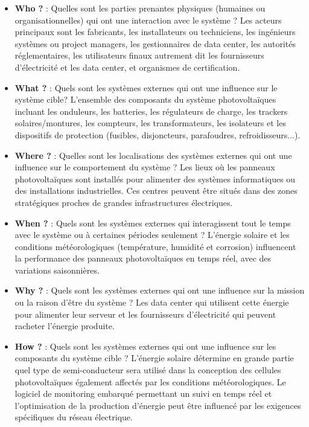 \documentclass{article}
\begin{document}
\begin{itemize}
    \item \textbf{Who ?} : Quelles sont les parties prenantes physiques (humaines ou organisationnelles) qui ont une interaction avec le système ?
    Les acteurs principaux sont les fabricants, les installateurs ou techniciens, les ingénieurs systèmes ou project managers, les gestionnaires de data center, les autorités réglementaires, les utilisateurs finaux autrement dit les fournisseurs d'électricité et les data center, et organismes de certification.
    \item \textbf{What ?} : Quels sont les systèmes externes qui ont une influence sur le système cible? L'ensemble des composants du système photovoltaïques incluant les onduleurs, les batteries, les régulateurs de charge, les trackers solaires/montures, les compteurs, les transformateurs, les isolateurs et les dispositifs de protection (fusibles, disjoncteurs, parafoudres, refroidisseurs...).
    \item \textbf{Where ?} : Quelles sont les localisations des systèmes externes qui ont une influence sur le comportement du système ?
    Les lieux où les panneaux photovoltaïques sont installés pour alimenter des systèmes informatiques ou des installations industrielles. Ces centres peuvent être situés dans des zones stratégiques proches de grandes infrastructures électriques.
    \item \textbf{When ?} : Quels sont les systèmes externes qui interagissent tout le temps avec le système ou à certaines périodes seulement ?  L'énergie solaire et les conditions météorologiques (température, humidité et corrosion) influencent la performance des panneaux photovoltaïques en temps réel, avec des variations saisonnières. 
    \item \textbf{Why ?} : Quels sont les systèmes externes qui ont une influence sur la mission ou la raison d’être du système ? Les data center qui utilisent cette énergie pour alimenter leur serveur et les fournisseurs d'électricité qui peuvent racheter l'énergie produite.
    \item \textbf{How ?} : Quels sont les systèmes externes qui ont une influence sur les composants du système cible ? L'énergie solaire détermine en grande partie quel type de semi-conducteur sera utilisé dans la conception des cellules photovoltaïques également affectés par les conditions météorologiques. Le logiciel de monitoring embarqué permettant un suivi en temps réel et l'optimisation de la production d'énergie peut être influencé par les exigences spécifiques du réseau électrique.
\end {itemize}
\end{document}
